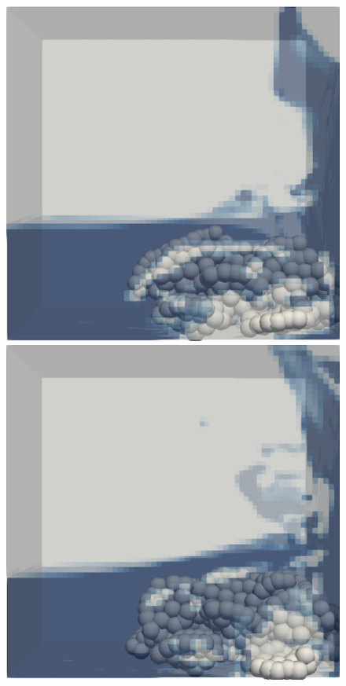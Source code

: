 \begin{figure}[H]
\begin{minipage}{.4\textwidth}
    \end{minipage}
    \newline
    \begin{minipage}{.4\textwidth}
        \centering
        \includegraphics[width=\linewidth]{Images/chap4/landslide_3.png}
    \end{minipage}%
    \hspace{0.05\textwidth}
    \begin{minipage}{.4\textwidth}
        \centering
        \includegraphics[width=\linewidth]{Images/chap4/landslide_4.png}

\end{minipage}
\end{figure}
